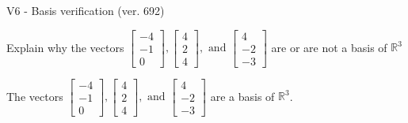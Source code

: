 \begin{exercise}
  \begin{exerciseTitle}V6 - Basis verification (ver. 692)\end{exerciseTitle}
  \begin{exerciseStatement}
    Explain why the vectors \(\left[\begin{array}{r}
-4 \\
-1 \\
0
\end{array}\right] , \left[\begin{array}{r}
4 \\
2 \\
4
\end{array}\right] , \text{ and } \left[\begin{array}{r}
4 \\
-2 \\
-3
\end{array}\right]\) are or are not a basis of \(\mathbb{R}^3\)	


  \end{exerciseStatement}
  \begin{exerciseAnswer}
   The vectors \(\left[\begin{array}{r}
-4 \\
-1 \\
0
\end{array}\right] , \left[\begin{array}{r}
4 \\
2 \\
4
\end{array}\right] , \text{ and } \left[\begin{array}{r}
4 \\
-2 \\
-3
\end{array}\right]\) 
  	 are  a basis of \(\mathbb{R}^3\).
  


  \end{exerciseAnswer}
\end{exercise}